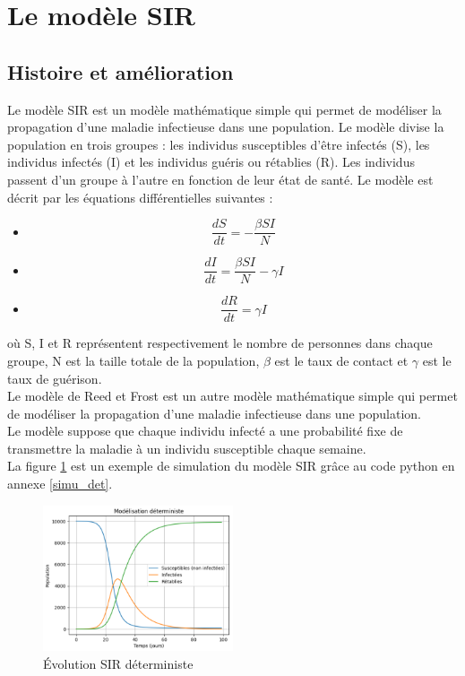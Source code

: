 \section{Le modèle SIR}
        \subsection{Histoire et amélioration}

Le modèle SIR est un modèle mathématique simple qui permet de modéliser la propagation d'une maladie infectieuse dans une population. Le modèle divise la population en trois groupes : les individus susceptibles d'être infectés (S), les individus infectés (I) et les individus guéris ou rétablies (R). Les individus passent d'un groupe à l'autre en fonction de leur état de santé. Le modèle est décrit par les équations différentielles suivantes :
	\begin{itemize}[label=$\bullet$]
	\item $$\displaystyle \frac{dS}{dt} = -\frac{\beta SI}{N}$$
	\end{itemize}
	
	\begin{itemize}[label=$\bullet$]
	\item $$\displaystyle \frac{dI}{dt} = \frac{\beta SI}{N} - \gamma I$$
	\end{itemize}
	
	\begin{itemize}[label=$\bullet$]
	\item $$\displaystyle \frac{dR}{dt} = \gamma I$$
	\end{itemize}
où S, I et R représentent respectivement le nombre de personnes dans chaque groupe, N est la taille totale de la population, $\beta$ est le taux de contact et $\gamma$ est le taux de guérison.\\Le modèle de Reed et Frost est un autre modèle mathématique simple qui permet de modéliser la propagation d'une maladie infectieuse dans une population.\\Le modèle suppose que chaque individu infecté a une probabilité fixe de transmettre la maladie à un individu susceptible chaque semaine.\\
La figure \ref{fig:sir_deterministe} est un exemple de simulation du modèle SIR grâce au code python en annexe \ref{simu_det}.
	\begin{figure}[h]
    \centering
	\includegraphics[width=0.5\textwidth]{figs/sir_deterministe.png}
    \caption{Évolution SIR déterministe}
    \label{fig:sir_deterministe}
	\end{figure}
	